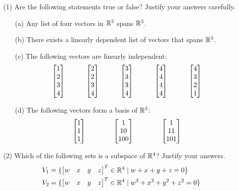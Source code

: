 \documentclass[a4paper]{article}
\begin{document}
\begin{problem}[2011-12]
 \begin{itemize}
  \item[(1)]
   Are the following statements true or false?  Justify your answers
   carefully. 
   \begin{itemize}
    \item[(a)] Any list of four vectors in ${\mathbb{R}}^3$ spans ${\mathbb{R}}^3$.
    \item[(b)] There exists a linearly dependent list of vectors that
     spans ${\mathbb{R}}^3$.
    \item[(c)] The following vectors are linearly independent:
     \[ \left[\begin{matrix} 1\\ 2\\ 3\\ 4 \end{matrix}\right] \hspace{3em}
        \left[\begin{matrix} 2\\ 2\\ 3\\ 4 \end{matrix}\right] \hspace{3em}
        \left[\begin{matrix} 3\\ 3\\ 3\\ 4 \end{matrix}\right] \hspace{3em}
        \left[\begin{matrix} 4\\ 4\\ 4\\ 4 \end{matrix}\right] \hspace{3em}
        \left[\begin{matrix} 4\\ 3\\ 2\\ 1 \end{matrix}\right]
     \]
    \item[(d)] The following vectors form a basis of ${\mathbb{R}}^3$:
     \[ \left[\begin{matrix} 1 \\ 1 \\ 1 \end{matrix}\right] \hspace{4em}
        \left[\begin{matrix} 1 \\ 10 \\ 100 \end{matrix}\right] \hspace{4em}
        \left[\begin{matrix} 1 \\ 11 \\ 101 \end{matrix}\right]
     \]
   \end{itemize}
  \item[(2)]
   Which of the following sets is a subspace of ${\mathbb{R}}^4$?  Justify your
   answers. 
   \begin{align*}
    V_1 &= \{\bbm w&x&y&z\ebm^T \in\R^4 \st w+x+y+z=0\} \\
    V_2 &= \{\bbm w&x&y&z\ebm^T \in\R^4 \st w^2+x^2+y^2+z^2=0\} \\

\end{align*}
\end{itemize}
\end{problem}
\end{document}
